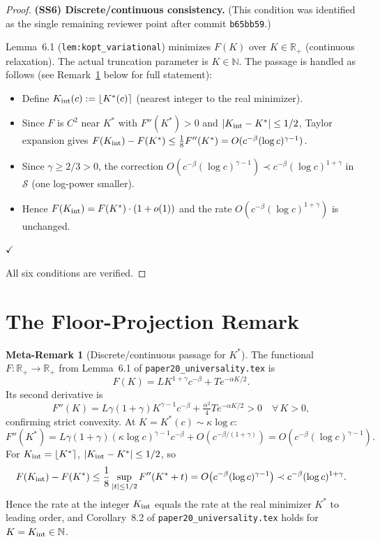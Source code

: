 \documentclass[12pt,a4paper]{amsart}
\theoremstyle{definition}
\newtheorem{metaremark}[metatheorem]{Meta-Remark}
\newcommand{\R}{\mathbb{R}}
\newcommand{\N}{\mathbb{N}}
\begin{document}
\begin{proof}
\medskip
\textbf{(SS6) Discrete/continuous consistency.}
(This condition was identified as the single remaining
reviewer point after commit \texttt{b65bb59}.)

Lemma~6.1 (\texttt{lem:kopt\_variational})
minimizes $F(K)$ over $K\in\R_+$ (continuous relaxation).
The actual truncation parameter is $K\in\N$.
The passage is handled as follows
(see Remark~\ref{mrem:discrete} below for full statement):
\begin{itemize}[nosep]
  \item Define $K_{\rm int}(c) := \lfloor K^*(c)\rceil$
    (nearest integer to the real minimizer).
  \item Since $F$ is $C^2$ near $K^*$ with
    $F''(K^*)>0$ and $|K_{\rm int}-K^*|\leq 1/2$,
    Taylor expansion gives
    $F(K_{\rm int}) - F(K^*) \leq
    \tfrac{1}{8}F''(K^*) = O(c^{-\beta}(\log c)^{\gamma-1})$.
  \item Since $\gamma\geq 2/3 > 0$, the correction
    $O(c^{-\beta}(\log c)^{\gamma-1})
    \prec c^{-\beta}(\log c)^{1+\gamma}$
    in $\mathcal{S}$ (one log-power smaller).
  \item Hence $F(K_{\rm int}) = F(K^*)\cdot(1+o(1))$
    and the rate $O(c^{-\beta}(\log c)^{1+\gamma})$
    is unchanged.
\end{itemize}
\hfill$\checkmark$

All six conditions are verified.
\end{proof}

\section{The Floor-Projection Remark}
\label{sec:discrete}

\begin{metaremark}[Discrete/continuous passage for $K^*$]
\label{mrem:discrete}
The functional $F:\R_+\to\R_+$ from Lemma~6.1 of
\texttt{paper20\_universality.tex} is
\[
  F(K) = L K^{1+\gamma}c^{-\beta} + T e^{-\alpha K/2}.
\]
Its second derivative is
\[
  F''(K) = L\gamma(1+\gamma)K^{\gamma-1}c^{-\beta}
           + \tfrac{\alpha^2}{4}T e^{-\alpha K/2} > 0
  \quad \forall\,K>0,
\]
confirming strict convexity.
At $K = K^*(c)\sim\kappa\log c$:
\[
  F''(K^*)
  = L\gamma(1+\gamma)(\kappa\log c)^{\gamma-1}c^{-\beta}
  + O(c^{-\beta/(1+\gamma)})
  = O\!\left(c^{-\beta}(\log c)^{\gamma-1}\right).
\]
For $K_{\rm int} = \lfloor K^*\rceil$,
$|K_{\rm int}-K^*|\leq 1/2$, so
\[
  F(K_{\rm int}) - F(K^*)
  \leq \frac{1}{8}\sup_{|t|\leq 1/2} F''(K^*+t)
  = O\!\left(c^{-\beta}(\log c)^{\gamma-1}\right)
  \prec c^{-\beta}(\log c)^{1+\gamma}.
\]
Hence the rate at the integer $K_{\rm int}$ equals
the rate at the real minimizer $K^*$ to leading order,
and Corollary~8.2 of \texttt{paper20\_universality.tex}
holds for $K = K_{\rm int}\in\N$.
\end{metaremark}
\end{document}
